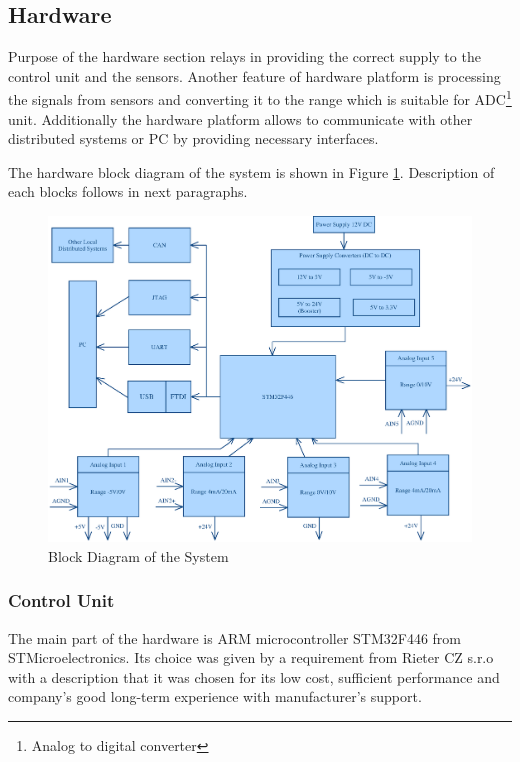 \documentclass[twoside]{ctuthesis}
\theoremstyle{plain}
\theoremstyle{definition}
\theoremstyle{note}
\begin{document}
\subsection{Hardware}
Purpose of the hardware section relays in providing the correct supply to the control unit and the sensors. Another feature of hardware platform is processing the signals from sensors and converting it to the range which is suitable for ADC\footnote{Analog to digital converter} unit. Additionally the hardware platform allows to communicate with other distributed systems or PC by providing necessary interfaces. 


The hardware block diagram of the system is shown in Figure \ref{fig:blockDiagram_HW}. Description of each blocks follows in next paragraphs.
\begin{figure}[h]
	\centering
	\includegraphics[width=1.0\textwidth]{blockSchematic4.eps}
	\caption{Block Diagram of the System}
	\label{fig:blockDiagram_HW}
\end{figure}

\subsubsection{Control Unit}
	The main part of the hardware is ARM microcontroller STM32F446 from STMicroelectronics. Its choice was given by a requirement from Rieter CZ s.r.o with a description that it was chosen for its low cost, sufficient performance and company's good long-term experience with manufacturer's support. 
	
\end{document}
